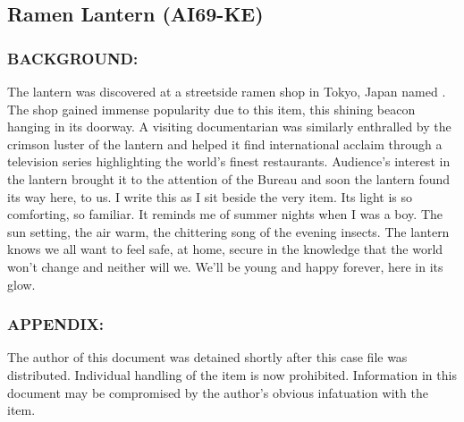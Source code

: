 \subsection*{Ramen Lantern (AI69-KE)}
\subsubsection*{BACKGROUND:}
\par The lantern was discovered at a streetside ramen shop in Tokyo,
Japan named . The shop gained immense popularity
due to this item, this shining beacon hanging in its doorway. A
visiting documentarian was similarly enthralled by the crimson
luster of the lantern and helped it find international acclaim
through a television series highlighting the world's finest
restaurants. Audience's interest in the lantern brought it to the
attention of the Bureau and soon the lantern found its way here,
to us. I write this as I sit beside the very item. Its light is so
comforting, so familiar. It reminds me of summer nights when I
was a boy. The sun setting, the air warm, the chittering song of
the evening insects. The lantern knows we all want to feel safe, at
home, secure in the knowledge that the world won't change and
neither will we. We'll be young and happy forever, here in its
glow.
\subsubsection*{APPENDIX:}
\par The author of this document was detained shortly after this case
file was distributed. Individual handling of the item is now
prohibited. Information in this document may be compromised by
the author's obvious infatuation with the item.